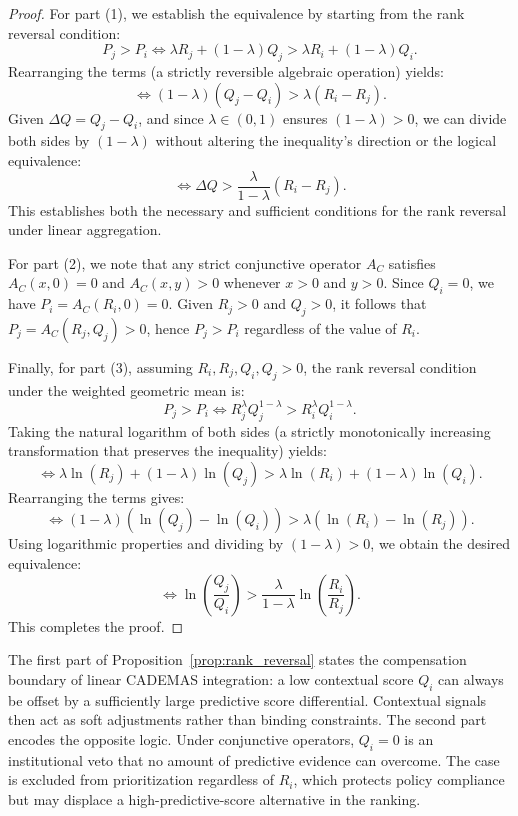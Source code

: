 \documentclass[mathematics,article,submit,moreauthors]{Definitions/mdpi}
\begin{document}
\begin{proof}
For part (1), we establish the equivalence by starting from the rank reversal condition:
$$P_j > P_i \iff \lambda R_j + (1-\lambda) Q_j > \lambda R_i + (1-\lambda) Q_i.$$
Rearranging the terms (a strictly reversible algebraic operation) yields:
$$\iff (1-\lambda)(Q_j - Q_i) > \lambda (R_i - R_j).$$
Given $\Delta Q = Q_j - Q_i$, and since $\lambda \in (0,1)$ ensures $(1-\lambda) > 0$, we can divide both sides by $(1-\lambda)$ without altering the inequality's direction or the logical equivalence:
$$\iff \Delta Q > \frac{\lambda}{1-\lambda}(R_i - R_j).$$
This establishes both the necessary and sufficient conditions for the rank reversal under linear aggregation.

For part (2), we note that any strict conjunctive operator $A_C$ satisfies $A_C(x,0)=0$ and $A_C(x,y)>0$ whenever $x>0$ and $y>0$. Since $Q_i=0$, we have $P_i = A_C(R_i,0)=0$. Given $R_j>0$ and $Q_j>0$, it follows that $P_j = A_C(R_j,Q_j) > 0$, hence $P_j > P_i$ regardless of the value of $R_i$.

Finally, for part (3), assuming $R_i, R_j, Q_i, Q_j > 0$, the rank reversal condition under the weighted geometric mean is:
$$P_j > P_i \iff R_j^\lambda Q_j^{1-\lambda} > R_i^\lambda Q_i^{1-\lambda}.$$
Taking the natural logarithm of both sides (a strictly monotonically increasing transformation that preserves the inequality) yields:
$$\iff \lambda \ln(R_j) + (1-\lambda) \ln(Q_j) > \lambda \ln(R_i) + (1-\lambda) \ln(Q_i).$$
Rearranging the terms gives:
$$\iff (1-\lambda)(\ln(Q_j) - \ln(Q_i)) > \lambda (\ln(R_i) - \ln(R_j)).$$
Using logarithmic properties and dividing by $(1-\lambda) > 0$, we obtain the desired equivalence:
\[
\iff \ln\left(\frac{Q_j}{Q_i}\right) > \frac{\lambda}{1-\lambda} \ln\left(\frac{R_i}{R_j}\right).
\]
This completes the proof.
\end{proof}

The first part of Proposition~\ref{prop:rank_reversal} states the compensation boundary of linear CADEMAS integration: a low contextual score $Q_i$ can always be offset by a sufficiently large predictive score differential. Contextual signals then act as soft adjustments rather than binding constraints. The second part encodes the opposite logic. Under conjunctive operators, $Q_i = 0$ is an institutional veto that no amount of predictive evidence can overcome. The case is excluded from prioritization regardless of $R_i$, which protects policy compliance but may displace a high-predictive-score alternative in the ranking.
\end{document}
